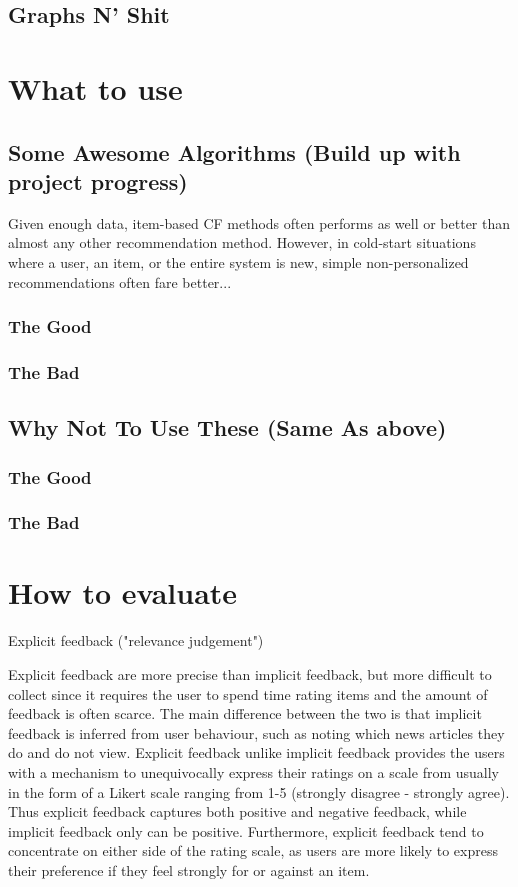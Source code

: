 \subsection{Graphs N' Shit}

\section{What to use}


%
\subsection{Some Awesome Algorithms (Build up with project progress)}

Given enough data, item-based CF methods often performs as well or better than almost any other recommendation method. However, in cold-start situations where a user, an item, or the entire system is new, simple non-personalized recommendations often fare better...

\subsubsection{The Good}
\subsubsection{The Bad}
\subsection{Why Not To Use These (Same As above)}
\subsubsection{The Good}
\subsubsection{The Bad}

\section{How to evaluate}

Explicit feedback ("relevance judgement")

Explicit feedback are more precise than implicit feedback, but more difficult to collect since it requires the user to spend time rating items and the amount of feedback is often scarce. The main difference between the two is that implicit feedback is inferred from user behaviour, such as noting which news articles they do and do not view. Explicit feedback unlike implicit feedback provides the users with a mechanism to unequivocally express their ratings on a scale from usually in the form of a Likert scale ranging from 1-5 (strongly disagree - strongly agree). Thus explicit feedback captures both positive and negative feedback, while implicit feedback only can be positive. Furthermore, explicit feedback tend to concentrate on either side of the rating scale, as users are more likely to express their preference if they feel strongly for or against an item.

